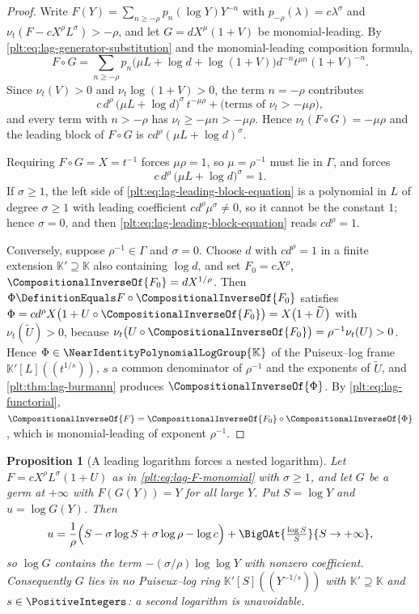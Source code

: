 \documentclass[11pt,oneside]{article}
\theoremstyle{plain}
\newtheorem{proposition}[theorem]{Proposition}
\theoremstyle{definition}
\theoremstyle{remark}
\newcommand{\K}{\mathbb{K}}
\newcommand{\Gnear}{\NearIdentityPolynomialLogGroup{\K}} %
\newcommand{\ordt}{\nu_{t}}                              %
\newcommand{\compose}{\mathbin{\circ}}
\newcommand{\rev}[1]{\CompositionalInverseOf{#1}}
\begin{document}
\begin{proof}
Write \(F(Y)=\sum_{n\ge-\rho}p_n(\log Y)Y^{-n}\) with
\(p_{-\rho}(\lambda)=c\lambda^{\sigma}\) and \(\ordt(F-cX^\rho L^\sigma)>-\rho\),
and let \(G=dX^{\mu}(1+V)\) be monomial-leading.  By
\cref{plt:eq:lag-generator-substitution} and the monomial-leading composition
formula,
\[
  F\compose G
  =\sum_{n\ge-\rho}p_n\bigl(\mu L+\log d+\log(1+V)\bigr)
     d^{-n}t^{\mu n}(1+V)^{-n}.
\]
Since \(\ordt(V)>0\) and \(\ordt\log(1+V)>0\), the term \(n=-\rho\) contributes
\[
  c\,d^{\rho}\,\bigl(\mu L+\log d\bigr)^{\sigma}\,t^{-\mu\rho}
  +\bigl(\text{terms of }\ordt>-\mu\rho\bigr),
\]
and every term with \(n>-\rho\) has \(\ordt\ge-\mu n>-\mu\rho\).  Hence
\(\ordt(F\compose G)=-\mu\rho\) and the leading block of \(F\compose G\) is
\(cd^{\rho}(\mu L+\log d)^{\sigma}\).

Requiring \(F\compose G=X=t^{-1}\) forces \(\mu\rho=1\), so \(\mu=\rho^{-1}\)
must lie in \(\Gamma\), and forces
\begin{equation}
\label{plt:eq:lag-leading-block-equation}
  c\,d^{\rho}\,\bigl(\mu L+\log d\bigr)^{\sigma}=1 .
\end{equation}
If \(\sigma\ge1\), the left side of \cref{plt:eq:lag-leading-block-equation} is
a polynomial in \(L\) of degree \(\sigma\ge1\) with leading coefficient
\(cd^{\rho}\mu^{\sigma}\ne0\), so it cannot be the constant \(1\); hence
\(\sigma=0\), and then \cref{plt:eq:lag-leading-block-equation} reads
\(cd^{\rho}=1\).

Conversely, suppose \(\rho^{-1}\in\Gamma\) and \(\sigma=0\).  Choose \(d\) with
\(cd^{\rho}=1\) in a finite extension \(\K'\supseteq\K\) also containing
\(\log d\), and set \(F_0=cX^{\rho}\), \(\rev{F_0}=dX^{1/\rho}\).  Then
\(\Phi\DefinitionEquals F\compose\rev{F_0}\) satisfies
\(\Phi=cd^{\rho}X\bigl(1+U\compose\rev{F_0}\bigr)=X\bigl(1+\widetilde U\bigr)\)
with \(\ordt(\widetilde U)>0\), because
\(\ordt\bigl(U\compose\rev{F_0}\bigr)=\rho^{-1}\ordt(U)>0\).  Hence
\(\Phi\in\Gnear\) of the Puiseux--log frame
\(\K'[L]((t^{1/s}))\), \(s\) a common denominator of \(\rho^{-1}\) and the
exponents of \(\widetilde U\), and \cref{plt:thm:lag-burmann} produces
\(\rev{\Phi}\).  By \cref{plt:eq:lag-functorial},
\(\rev{F}=\rev{F_0}\compose\rev{\Phi}\), which is monomial-leading of exponent
\(\rho^{-1}\).
\end{proof}

\begin{proposition}[A leading logarithm forces a nested logarithm]
\label{plt:prop:lag-loglog-forced}
Let \(F=cX^\rho L^\sigma(1+U)\) as in \cref{plt:eq:lag-F-monomial} with
\(\sigma\ge1\), and let \(G\) be a germ at \(+\infty\) with \(F(G(Y))=Y\) for
all large \(Y\).  Put \(S=\log Y\) and \(u=\log G(Y)\).  Then
\begin{equation}
\label{plt:eq:lag-loglog}
  u=\frac1\rho\Bigl(S-\sigma\log S+\sigma\log\rho-\log c\Bigr)
    +\BigOAt{\tfrac{\log S}{S}}{S\to+\infty},
\end{equation}
so \(\log G\) contains the term \(-(\sigma/\rho)\log\log Y\) with nonzero
coefficient.  Consequently \(G\) lies in no Puiseux--log ring
\(\K'[S]((Y^{-1/s}))\) with \(\K'\supseteq\K\) and \(s\in\PositiveIntegers\):
a second logarithm is unavoidable.
\end{proposition}
\end{document}

